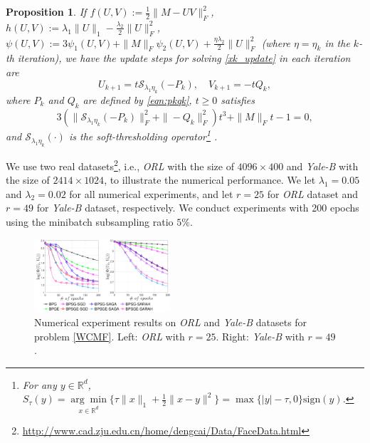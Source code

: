 \documentclass[letterpaper]{article} %
\newtheorem{proposition}{Proposition}
\begin{document}
	\begin{proposition}\label{prop_WCMF}
		If $f(U,V):=\frac{1}{2}\|M-UV\|_{F}^{2}$, $h(U,V):=\lambda_{1}\|U\|_{1}-\frac{\lambda_{2}}{2}\|U\|_{F}^{2}$, $\psi(U,V):=3\psi_{1}(U,V)+\|M\|_{F}\psi_{2}(U,V)+\frac{\eta\lambda_{2}}{2}\|U\|_{F}^{2}$ (where $\eta=\eta_{k}$ in the $k$-th iteration), we have  the update steps  for solving \eqref{xk_update}  in each iteration  are 
		\[
		U_{k+1}=t\mathcal{S}_{\lambda_{1}\eta_{k}}(-P_{k}),\quad V_{k+1}=-tQ_{k},
		\] 
		where $P_k$ and $Q_k$ are defined by \eqref{eqn:pkqk}, $t\ge0$ satisfies 
		\[
		3(\|\mathcal{S}_{\lambda_{1}\eta_{k}}(-P_{k})\|_{F}^{2}+\|-Q_{k}\|_{F}^{2}) t^{3}+\|M\|_{F}t-1=0,
		\]
		and $\mathcal{S}_{\lambda_{1}\eta_{k}}(\cdot)$ is the soft-thresholding operator\footnote{For any $y\in\mathbb{R}^{d}$, $S_{\tau}(y) =\underset{x\in\mathbb{R}^{d}}{\arg\min}\{\tau\|x\|_{1}+\frac{1}{2}\|x-y\|^{2}\}=\max\{|y|-\tau,0\}\text{sign}(y)$.} \cite{Donoho95}.
	\end{proposition}
	
	
	
	We use two real datasets\footnote{\url{http://www.cad.zju.edu.cn/home/dengcai/Data/FaceData.html}}, i.e., \emph{ORL} with the size of $4096 \times 400$ and \emph{Yale-B} with the size of $2414 \times 1024$, to illustrate the numerical performance.   We let $\lambda_{1}=0.05$ and $\lambda_{2}=0.02$ for all numerical experiments, and let $r=25$ for \emph{ORL} dataset and $r=49$ for \emph{Yale-B} dataset, respectively. 
	We conduct experiments with 200 epochs using the minibatch subsampling ratio  $5\%$. 
	\begin{figure}[!t]
		\centering
		\includegraphics[width=0.45\textwidth]{figs/WCMF_LOSS}
		\caption{Numerical experiment results on \emph{ORL} and \emph{Yale-B} datasets for   problem \eqref{WCMF}. Left: \emph{ORL} with $r=25$. Right: \emph{Yale-B} with $r=49$.
		}
		\label{WCMF_epochs}
	\end{figure}
	
\end{document}
